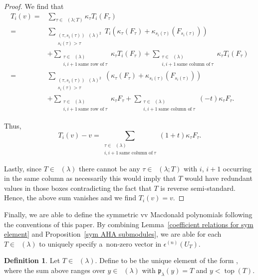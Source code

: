\documentclass[pdftex]{sigma}
\numberwithin{equation}{section}
\theoremstyle{definition}
\newtheorem{Definition}[Theorem]{Definition}
\DeclareMathOperator{\PSYT}{\mathrm{PSYT}_{\geq 0}}
\DeclareMathOperator{\RSSYT}{\mathrm{RSSYT}_{\geq 0}}
\DeclareMathOperator{\Top}{\mathrm{top}}
\begin{document}
\begin{proof}
 We find that
 \begin{align*}
 T_i(v)
 ={}& \sum_{\tau \in \PSYT(\lambda;T)} \kappa_{\tau} T_i(F_{\tau}) \\
 ={}& \sum_{\substack{(\tau, s_i(\tau))\PSYT(\lambda)^2 \\ s_i(\tau) > \tau}}T_i\left(\kappa_{\tau} (F_{\tau}) + \kappa_{s_i(\tau)} (F_{s_i(\tau)}) \right) \\
 & + \sum_{\substack{\tau \in \PSYT(\lambda) \\ i,i+1 ~\text{same row of}~ \tau }} \kappa_{\tau} T_i(F_{\tau}) + \sum_{\substack{\tau \in \PSYT(\lambda) \\ i,i+1 ~\text{same column of}~ \tau }} \kappa_{\tau} T_i(F_{\tau}) \\
 ={}& \sum_{\substack{(\tau, s_i(\tau))\PSYT(\lambda)^2 \\ s_i(\tau) > \tau}}\left(\kappa_{\tau} (F_{\tau}) + \kappa_{s_i(\tau)} (F_{s_i(\tau)}) \right) \\
 & + \sum_{\substack{\tau \in \PSYT(\lambda) \\ i,i+1 ~\text{same row of}~ \tau }} \kappa_{\tau} F_{\tau} + \sum_{\substack{\tau \in \PSYT(\lambda) \\ i,i+1 ~\text{same column of}~ \tau }} (-t) \kappa_{\tau} F_{\tau}.
 \end{align*}

 Thus,
 \[
 T_i(v) - v = \sum_{\substack{\tau \in \PSYT(\lambda) \\ i,i+1 ~\text{same column of}~ \tau }} (1+t)\kappa_{\tau} F_{\tau}.
 \]

 Lastly, since $T \in \RSSYT(\lambda)$ there cannot be any $\tau \in \PSYT(\lambda;T)$ with $i$, $i+1$ occurring in the same column as necessarily this would imply that $T$ would have redundant values in those boxes contradicting the fact that $T$ is reverse semi-standard. Hence, the above sum vanishes and we find $T_i(v) = v$.
 \end{proof}

Finally, we are able to define the symmetric vv Macdonald polynomials following the conventions of this paper. By combining Lemma~\ref{coefficient relations for sym element} and Proposition~\ref{sym AHA submodules}, we are able for each $T \in \RSSYT(\lambda)$ to uniquely specify a~non-zero vector in $\epsilon^{(n)}(U_T)$.

\begin{Definition}\label{Macdonald polynomial def}
 Let $T \in \RSSYT(\lambda)$. Define  to be the unique element of the form
 \smash{$
 P_T = F_{\Top(T)} + \sum_{y} \kappa_{y}F_y$},
 where the sum above ranges over $y \in \PSYT(\lambda)$ with $\mathfrak{p}_{\lambda}(y) = T$ and $y < \Top(T)$.
\end{Definition}
\end{document}
